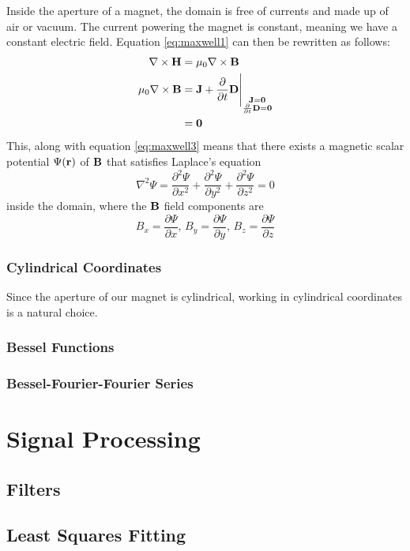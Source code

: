 Inside the aperture of a magnet, the domain is free of currents and made
up of air or vacuum. The current powering the magnet is constant,
meaning we have a constant electric field. Equation \ref{eq:maxwell1}
can then be rewritten as follows:
\begin{align}
    \begin{split}
        \nabla \times \vb{H} &= \mu_0\nabla \times \vb{B}\\
        \mu_0\nabla \times \vb{B}
        &=\vb{J} + \frac{\partial}{\partial t}\vb{D}
        \Bigg\vert_{\substack{\vb{J}=\vb{0} \\
                \frac{\partial}{\partial t}\vb{D}=\vb{0}}} \\
        &= \vb{0}
    \end{split}
\end{align}
This, along with equation \ref{eq:maxwell3} means that there
exists a magnetic scalar potential $\Psi(\vb{r})$ of $\vb{B}$ that satisfies
Laplace's equation
\begin{equation}
    \nabla^2\Psi = \frac{\partial^2 \Psi}{\partial x^2}
    + \frac{\partial^2 \Psi}{\partial y^2}
    + \frac{\partial^2 \Psi}{\partial z^2} = 0
\end{equation}
inside the domain, where the $\vb{B}$ field components are
\begin{equation}
    B_x = \frac{\partial \Psi}{\partial x}, \,
    B_y = \frac{\partial \Psi}{\partial y}, \,
    B_z = \frac{\partial \Psi}{\partial z}
\end{equation}
\subsubsection{Cylindrical Coordinates}
Since the aperture of our magnet is cylindrical, working in cylindrical
coordinates is a natural choice.
\subsubsection{Bessel Functions}
\subsubsection{Bessel-Fourier-Fourier Series}

\section{Signal Processing}
\subsection{Filters}
\subsection{Least Squares Fitting}